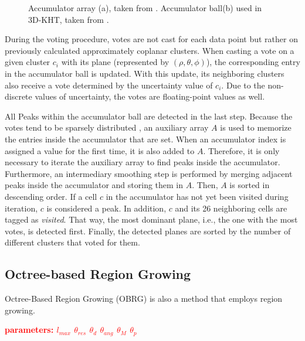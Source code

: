 \documentclass[main.tex]{subfiles}
\begin{document}
\begin{figure}[H]
\begin{subfigure}{0.25\textwidth}
        \caption[3D-KHT Accumulator Ball]{}
        \label{fig:accball}
    \end{subfigure}
    \hspace{\fill}
    \caption[Hough Transform Accumulators]{Accumulator array (a), taken from \cite*[Figure~3]{Borrmann_Elseberg_Lingemann_Nüchter_2011}. Accumulator
        ball(b) used in 3D-KHT, taken from \cite*[Figure~5]{Limberger_Oliveira_2015}.}
\end{figure}

During the voting procedure, votes are not cast for each data point but rather on previously calculated approximately coplanar clusters.
When casting a vote on a given cluster $c_i$ with its plane (represented by $(\rho, \theta, \phi)$), the corresponding entry in the accumulator ball is updated.
With this update, its neighboring clusters also receive a vote determined by the uncertainty value of $c_i$. Due to the non-discrete
values of uncertainty, the votes are floating-point values as well.

All Peaks within the accumulator ball are detected in the last step. Because the votes tend to be sparsely distributed \cite[Section~3.4]{Limberger_Oliveira_2015},
an auxiliary array $A$ is used to memorize the entries inside the accumulator that are set. When an accumulator index is assigned a value for the first time, it is also added to $A$.
Therefore, it is only necessary to iterate the auxiliary array to find peaks inside the accumulator.
Furthermore, an intermediary smoothing step is performed by merging adjacent peaks inside the accumulator and storing them in $A$.
Then, $A$ is sorted in descending order.
If a cell $c$ in the accumulator has not yet been visited during iteration, $c$ is considered a peak. In addition, $c$ and its 26 neighboring cells are tagged as \textit{visited}.
That way, the most dominant plane, i.e., the one with the most votes, is detected first.
Finally, the detected planes are sorted by the number of different clusters that voted for them.

\subsection{Octree-based Region Growing}
\label{subsec:bg-obrg}
Octree-Based Region Growing (OBRG) \cite{Vo_Truong-Hong_Laefer_Bertolotto_2015} is also a method that employs region growing.

\textbf{\textcolor{red}{parameters: $l_{max}$ $\theta_{res}$  $\theta_{d}$  $\theta_{ang}$  $\theta_M$  $\theta_p$}}
\end{document}
